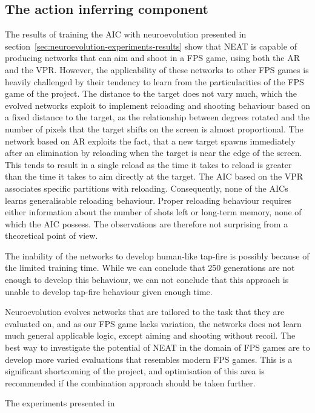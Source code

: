 \subsection{The action inferring component}
The results of training the AIC with neuroevolution presented in section~\ref{sec:neuroevolution-experiments-results} show that NEAT is capable of producing networks that can aim and shoot in a FPS game, using both the AR and the VPR. However, the applicability of these networks to other FPS games is heavily challenged by their tendency to learn from the particularities of the FPS game of the project. The distance to the target does not vary much, which the evolved networks exploit to implement reloading and shooting behaviour based on a fixed distance to the target, as the relationship between degrees rotated and the number of pixels that the target shifts on the screen is almost proportional. The network based on AR exploits the fact, that a new target spawns immediately after an elimination by reloading when the target is near the edge of the screen. This tends to result in a single reload as the time it takes to reload is greater than the time it takes to aim directly at the target. The AIC based on the VPR associates specific partitions with reloading. Consequently, none of the AICs learns generalisable reloading behaviour. Proper reloading behaviour requires either information about the number of shots left or long-term memory, none of which the AIC possess. The observations are therefore not surprising from a theoretical point of view.

The inability of the networks to develop human-like tap-fire is possibly because of the limited training time. While we can conclude that 250 generations are not enough to develop this behaviour, we can not conclude that this approach is unable to develop tap-fire behaviour given enough time.

Neuroevolution evolves networks that are tailored to the task that they are evaluated on, and as our FPS game lacks variation, the networks does not learn much general applicable logic, except aiming and shooting without recoil. The best way to investigate the potential of NEAT in the domain of FPS games are to develop more varied evaluations that resembles modern FPS games. This is a significant shortcoming of the project, and optimisation of this area is recommended if the combination approach should be taken further.

The experiments presented in 


